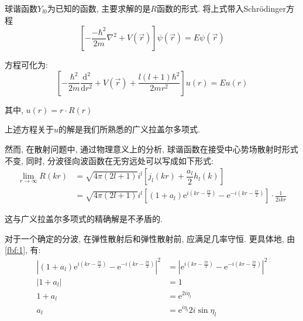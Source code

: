 \documentclass[a4paper, 11pt]{article}
\begin{document}
\begin{spacing}{1.2}
          球谐函数$Y_{l0}$为已知的函数, 主要求解的是$R$函数的形式.
          将上式带入Schr\"odinger方程
          \begin{equation}
            \label{fbf:2}
            \left[-\dfrac{-\hbar^2}{2m}\nabla^2+V(\vec{r})\right]\psi(\vec{r}) = E\psi(\vec{r})
          \end{equation}

          方程可化为:
          \begin{equation}
            \left[-\dfrac{\hbar^2}{2m}\dfrac{\mathrm{d}^2}{\mathrm{d}r^2}+%
            V(\vec{r})+ \dfrac{l(l+1)\hbar^2}{2mr^2}\right]u(r) = Eu(r)
          \end{equation}
          
          其中, $u(r) = r\cdot{}R(r)$

          上述方程关于$u$的解是我们所熟悉的广义拉盖尔多项式.
          
          然而, 在散射问题中, 通过物理意义上的分析, 球谐函数在接受中心势场散射时形式不变,  
          同时, 分波径向波函数在无穷远处可以写成如下形式:
          \begin{equation}
            \begin{aligned}
              \lim_{r\to\infty}R(kr) &= %
              \sqrt{4\pi(2l+1)}i^l\left[j_l(kr)+\dfrac{a_l}{2}h_l(k)\right]\\
              &= \sqrt{4\pi(2l+1)}i^l\left[(1+a_l)\mathrm{e}^{i(kr-\frac{l\pi}{2})}-%
                       \mathrm{e}^{-i(kr-\frac{l\pi}{2})}\right]\cdot\frac{1}{2ikr}
            \end{aligned}
          \end{equation}

          这与广义拉盖尔多项式的精确解是不矛盾的. 

          对于一个确定的分波, 在弹性散射后和弹性散射前, 应满足几率守恒. 更具体地, 由\eqref{fbf:1}, 有:  
          \begin{equation}
            \begin{aligned}
              \left|(1+a_l)\mathrm{e}^{i(kr-\frac{l\pi}{2})}-\mathrm{e}^{-i(kr-\frac{l\pi}{2})}\right|^2 &= %
              \left|\mathrm{e}^{i(kr-\frac{l\pi}{2})}-\mathrm{e}^{-i(kr-\frac{l\pi}{2})}\right|^2\\
              |1+a_l| &= 1\\
              1 + a_l &= \mathrm{e}^{2i\eta_l}\\
              a_l &= \mathrm{e}^{i\eta_l}2i\sin\eta_l 
            \end{aligned}
          \end{equation}
           

\end{spacing}
\end{document}
